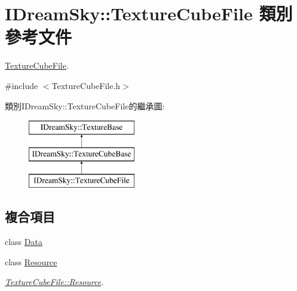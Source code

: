 \hypertarget{class_i_dream_sky_1_1_texture_cube_file}{}\section{I\+Dream\+Sky\+:\+:Texture\+Cube\+File 類別 參考文件}
\label{class_i_dream_sky_1_1_texture_cube_file}


\hyperlink{class_i_dream_sky_1_1_texture_cube_file}{Texture\+Cube\+File}.  




{\ttfamily \#include $<$Texture\+Cube\+File.\+h$>$}

類別\+I\+Dream\+Sky\+:\+:Texture\+Cube\+File的繼承圖\+:\begin{figure}[H]
\begin{center}
\leavevmode
\includegraphics[height=3.000000cm]{class_i_dream_sky_1_1_texture_cube_file}
\end{center}
\end{figure}
\subsection*{複合項目}
\begin{DoxyCompactItemize}
\item 
class \hyperlink{class_i_dream_sky_1_1_texture_cube_file_1_1_data}{Data}
\item 
class \hyperlink{class_i_dream_sky_1_1_texture_cube_file_1_1_resource}{Resource}
\begin{DoxyCompactList}\small\item\em \hyperlink{class_i_dream_sky_1_1_texture_cube_file_1_1_resource}{Texture\+Cube\+File\+::\+Resource}. \end{DoxyCompactList}\end{DoxyCompactItemize}
